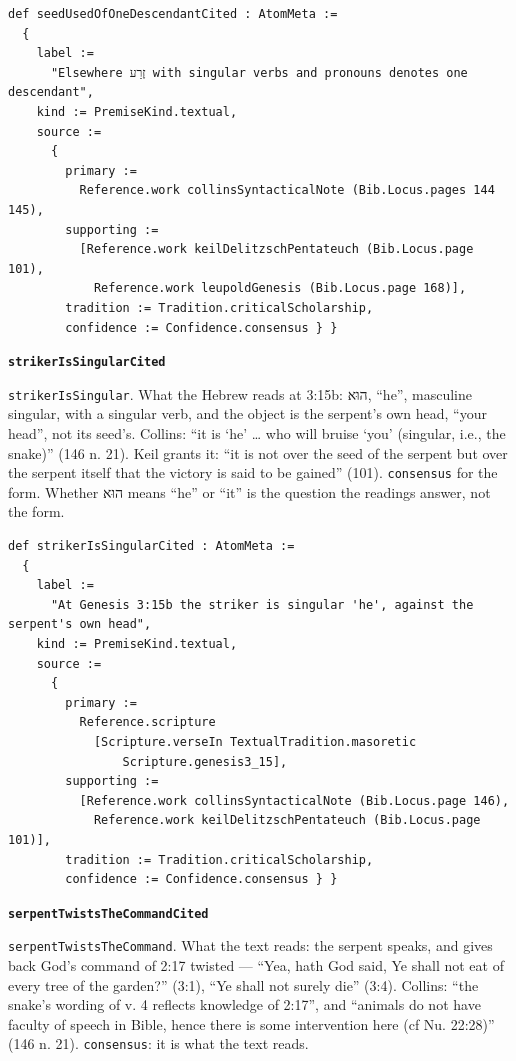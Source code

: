 \documentclass[11pt]{article}
\begin{document}
{\small\begin{verbatim}
def seedUsedOfOneDescendantCited : AtomMeta :=
  {
    label :=
      "Elsewhere זֶרַע with singular verbs and pronouns denotes one descendant",
    kind := PremiseKind.textual,
    source :=
      {
        primary :=
          Reference.work collinsSyntacticalNote (Bib.Locus.pages 144 145),
        supporting :=
          [Reference.work keilDelitzschPentateuch (Bib.Locus.page 101),
            Reference.work leupoldGenesis (Bib.Locus.page 168)],
        tradition := Tradition.criticalScholarship,
        confidence := Confidence.consensus } }
\end{verbatim}}
\par\medskip\noindent\textbf{\texttt{striker\allowbreak{}Is\allowbreak{}Singular\allowbreak{}Cited}}\par\nobreak\noindent
\texttt{striker\allowbreak{}Is\allowbreak{}Singular}. What the Hebrew reads at 3:15b: הוּא, “he”, masculine singular, with a singular verb, and the object is the serpent’s own head, “your head”, not its seed’s. Collins: “it is ‘he’ … who will bruise ‘you’ (singular, i.e., the snake)” (146 n. 21). Keil grants it: “it is not over the seed of the serpent but over the serpent itself that the victory is said to be gained” (101). \texttt{consensus} for the form. Whether הוּא means “he” or “it” is the question the readings answer, not the form.

{\small\begin{verbatim}
def strikerIsSingularCited : AtomMeta :=
  {
    label :=
      "At Genesis 3:15b the striker is singular 'he', against the serpent's own head",
    kind := PremiseKind.textual,
    source :=
      {
        primary :=
          Reference.scripture
            [Scripture.verseIn TextualTradition.masoretic
                Scripture.genesis3_15],
        supporting :=
          [Reference.work collinsSyntacticalNote (Bib.Locus.page 146),
            Reference.work keilDelitzschPentateuch (Bib.Locus.page 101)],
        tradition := Tradition.criticalScholarship,
        confidence := Confidence.consensus } }
\end{verbatim}}
\par\medskip\noindent\textbf{\texttt{serpent\allowbreak{}Twists\allowbreak{}The\allowbreak{}Command\allowbreak{}Cited}}\par\nobreak\noindent
\texttt{serpent\allowbreak{}Twists\allowbreak{}The\allowbreak{}Command}. What the text reads: the serpent speaks, and gives back God’s command of 2:17 twisted — “Yea, hath God said, Ye shall not eat of every tree of the garden?” (3:1), “Ye shall not surely die” (3:4). Collins: “the snake’s wording of v. 4 reflects knowledge of 2:17”, and “animals do not have faculty of speech in Bible, hence there is some intervention here (cf Nu. 22:28)” (146 n. 21). \texttt{consensus}: it is what the text reads.
\end{document}
